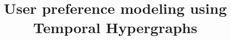 \documentclass[conference]{IEEEtran}
\begin{document}
%
\title{User preference modeling using Temporal Hypergraphs}



% 


\maketitle
\end{document}
